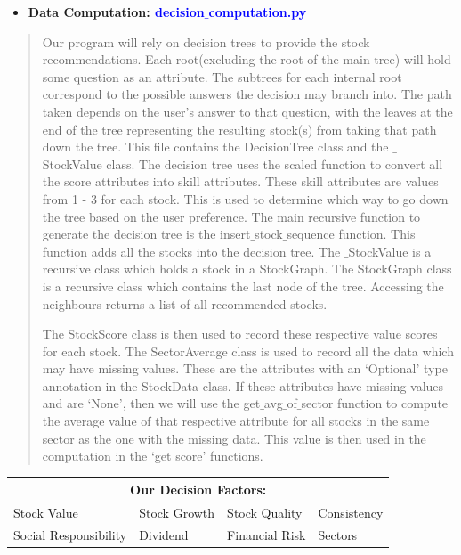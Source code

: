\documentclass[fontsize=12pt]{article}
\begin{document}
\begin{itemize}
\item
  
  \textbf{Data Computation: \textcolor{blue}{decision$\_$computation.py}}
 
\end{itemize}
\begin{quote}
\noindent Our program will rely on decision trees to provide the stock recommendations. Each root(excluding the root of the main tree) will hold some question as an attribute. The subtrees for each internal root correspond to the possible answers the decision may branch into. The path taken depends on the user’s answer to that question, with the leaves at the end of the tree representing the resulting stock(s) from taking that path down the tree. This file contains the DecisionTree class and the $\_$StockValue class. The decision tree uses the scaled function to convert all the score attributes into skill attributes. These skill attributes are values from 1 - 3 for each stock. This is used to determine which way to go down the tree based on the user preference. The main recursive function to generate the decision tree is the insert$\_$stock$\_$sequence function. This function adds all the stocks into the decision tree. The $\_$StockValue is a recursive class which holds a stock in a StockGraph. The StockGraph class is a recursive class which contains the last node of the tree. Accessing the neighbours returns a list of all recommended stocks.

The StockScore class is then used to record these respective value scores for each stock. The SectorAverage class is used to record all the data which may have missing values. These are the attributes with an ‘Optional’ type annotation in the StockData class. If these attributes have missing values and are ‘None’, then we will use the get$\_$avg$\_$of$\_$sector function to compute the average value of that respective attribute for all stocks in the same sector as the one with the missing data. This value is then used in the computation in the ‘get score’ functions. 
\end{quote}

\begin{center}
\begin{tabular}{ |p{3.5cm}|p{3.5cm}|p{3.5cm}|p{3.5cm}|}
 \hline
 \multicolumn{4}{|c|}{Our Decision Factors:} \\
 \hline
 Stock Value & Stock Growth & Stock Quality & Consistency\\
 \hline
 Social Responsibility & Dividend & Financial Risk & Sectors\\
 \hline
\end{tabular}
\end{center}
\end{document}
